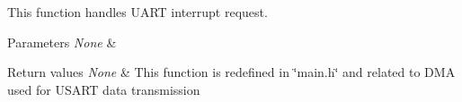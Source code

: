 This function handles U\+A\+RT interrupt request. 


\begin{DoxyParams}{Parameters}
{\em None} & \\
\hline
\end{DoxyParams}

\begin{DoxyRetVals}{Return values}
{\em None} & This function is redefined in \char`\"{}main.\+h\char`\"{} and related to D\+MA used for U\+S\+A\+RT data transmission \\
\hline
\end{DoxyRetVals}
